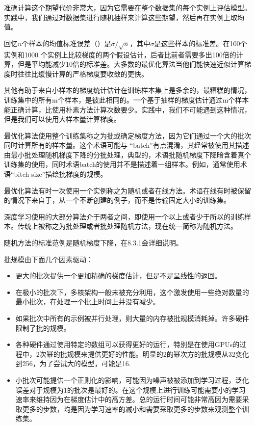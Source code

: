 准确计算这个期望代价非常大，因为它需要在整个数据集的每个实例上评估模型。实践中，我们通过对数据集进行随机抽样来计算这些期望，然后再在实例上取均值。

回忆$n$个样本的均值标准误差（）是$\sigma/\sqrt{n}$，其中$\sigma$是这些样本的标准差。在100个实例和1000 个实例上比较梯度的两个假设估计，后者比前者需要多出100倍的计算，但是平均能减少10倍的标准差。大多数的最优化算法当他们能快速近似计算梯度时往往比缓慢计算的严格梯度要收敛的更快。

其他有助于来自小样本的梯度统计估计在训练样本集上是多余的，最糟糕的情况，训练集中的所有m个样本，是彼此相同的。一个基于抽样的梯度估计通过m个样本能正确计算，比使用朴素方法计算次数要少。实践中，我们不可能遇到这种情况，但是我们可以使用大样本量计算梯度。

最优化算法使用整个训练集称之为批或确定梯度方法，因为它们通过一个大的批次同时计算所有的样本量。这个术语可能与 “batch”有点混淆，其经常被使用其描述由最小批处理随机梯度下降的分批处理，典型的，术语批随机梯度下降暗含着真个训练集的使用，同时术语batch的使用并不是描述着一组样本。例如，通常使用术语“bitch size”描绘批梯度的规模。

最优化算法有时一次使用一个实例称之为随机或者在线方法。术语在线有时被保留的情况下来自于，从一个不断创建的例子，而不是传输固定大小的训练集。

深度学习使用的大部分算法介于两者之间，即使用一个以上或者少于所以的训练样本。传统上被称之为批处理或者批处理随机方法，现在统一简称为随机方法。

随机方法的标准范例是随机梯度下降，在8.3.1会详细说明。

批规模由下面几个因素驱动：
\begin{itemize}
\item 更大的批次提供一个更加精确的梯度估计，但是不是呈线性的返回。
\item 在极小的批次下，多核架构一般未被充分利用，这个激发使用一些绝对数量的最小批次，在处理一个批上时间上并没有减少。
\item 如果批次中所有的示例被并行处理，则大量的内存被批规模消耗掉。许多硬件限制了批的规模。
\item 各种硬件通过使用特定的数组可以获得更好的运行，特别是在使用GPUs的过程中，2次幂的批规模来提供更好的性能。明显的2的幂次方的批规模从32变化到256，为了尝试大的模型，可能是16.
\item 小批次可能提供一个正则化的影响，可能因为噪声被被添加到学习过程，泛化误差对于规模为1的批次是最好的。在这个规模上进行训练可能需要小的学习速率来维持因为在梯度估计中的高方差。总的运行时间可能非常高因为需要采取更多的步数，均是因为学习速率的减小和需要采取更多的步数来观测整个训练集。
\end{itemize}

